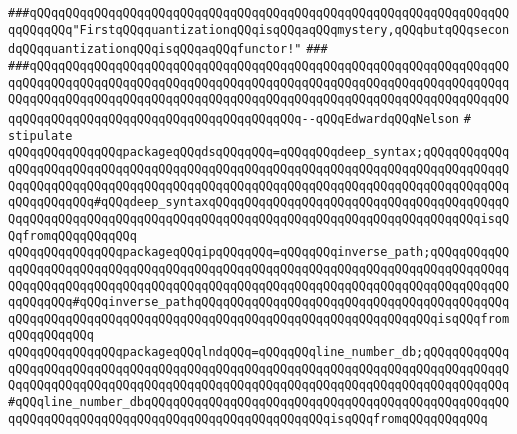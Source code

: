 \newline
\newline
\newline
\verb|###qQQqqQQqqQQqqQQqqQQqqQQqqQQqqQQqqQQqqQQqqQQqqQQqqQQqqQQqqQQqqQQqqQQqqQQqqQQq"FirstqQQqquantizationqQQqisqQQqaqQQqmystery,qQQqbutqQQqsecondqQQqquantizationqQQqisqQQqaqQQqfunctor!"|\newline
\verb|###|\newline
\verb|###qQQqqQQqqQQqqQQqqQQqqQQqqQQqqQQqqQQqqQQqqQQqqQQqqQQqqQQqqQQqqQQqqQQqqQQqqQQqqQQqqQQqqQQqqQQqqQQqqQQqqQQqqQQqqQQqqQQqqQQqqQQqqQQqqQQqqQQqqQQqqQQqqQQqqQQqqQQqqQQqqQQqqQQqqQQqqQQqqQQqqQQqqQQqqQQqqQQqqQQqqQQqqQQqqQQqqQQqqQQqqQQqqQQqqQQqqQQqqQQqqQQqqQQq--qQQqEdwardqQQqNelson|\newline
\newline
\verb|#|\newline
\newline
\verb|stipulate|\newline
\verb|qQQqqQQqqQQqqQQqpackageqQQqdsqQQqqQQq=qQQqqQQqdeep_syntax;qQQqqQQqqQQqqQQqqQQqqQQqqQQqqQQqqQQqqQQqqQQqqQQqqQQqqQQqqQQqqQQqqQQqqQQqqQQqqQQqqQQqqQQqqQQqqQQqqQQqqQQqqQQqqQQqqQQqqQQqqQQqqQQqqQQqqQQqqQQqqQQqqQQqqQQqqQQqqQQqqQQq#qQQqdeep_syntaxqQQqqQQqqQQqqQQqqQQqqQQqqQQqqQQqqQQqqQQqqQQqqQQqqQQqqQQqqQQqqQQqqQQqqQQqqQQqqQQqqQQqqQQqqQQqqQQqqQQqqQQqqQQqisqQQqfromqQQqqQQqqQQq|\newline
\verb|qQQqqQQqqQQqqQQqpackageqQQqipqQQqqQQq=qQQqqQQqinverse_path;qQQqqQQqqQQqqQQqqQQqqQQqqQQqqQQqqQQqqQQqqQQqqQQqqQQqqQQqqQQqqQQqqQQqqQQqqQQqqQQqqQQqqQQqqQQqqQQqqQQqqQQqqQQqqQQqqQQqqQQqqQQqqQQqqQQqqQQqqQQqqQQqqQQqqQQqqQQqqQQq#qQQqinverse_pathqQQqqQQqqQQqqQQqqQQqqQQqqQQqqQQqqQQqqQQqqQQqqQQqqQQqqQQqqQQqqQQqqQQqqQQqqQQqqQQqqQQqqQQqqQQqqQQqqQQqqQQqisqQQqfromqQQqqQQqqQQq|\newline
\verb|qQQqqQQqqQQqqQQqpackageqQQqlndqQQq=qQQqqQQqline_number_db;qQQqqQQqqQQqqQQqqQQqqQQqqQQqqQQqqQQqqQQqqQQqqQQqqQQqqQQqqQQqqQQqqQQqqQQqqQQqqQQqqQQqqQQqqQQqqQQqqQQqqQQqqQQqqQQqqQQqqQQqqQQqqQQqqQQqqQQqqQQqqQQqqQQqqQQq#qQQqline_number_dbqQQqqQQqqQQqqQQqqQQqqQQqqQQqqQQqqQQqqQQqqQQqqQQqqQQqqQQqqQQqqQQqqQQqqQQqqQQqqQQqqQQqqQQqqQQqqQQqisqQQqfromqQQqqQQqqQQq|\newline
